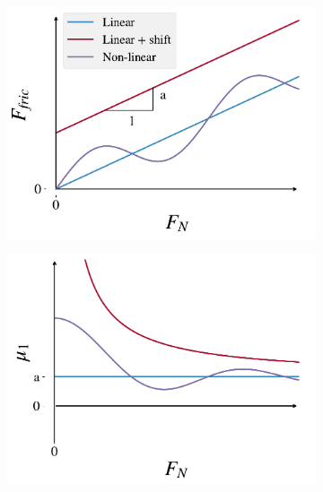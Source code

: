 

\begin{figure}[H]
  \centering
  \begin{subfigure}[t]{0.32\textwidth}
      \centering
      \includegraphics[width=\textwidth]{figures/theory/fric_coef_example_a.pdf}
      \caption{}
      \label{fig:fric_coef_example_a}
    \end{subfigure}
    \hfill
    \begin{subfigure}[t]{0.32\textwidth}
      \centering
      \includegraphics[width=\textwidth]{figures/theory/fric_coef_example_b.pdf}

\end{subfigure}
\end{figure}
